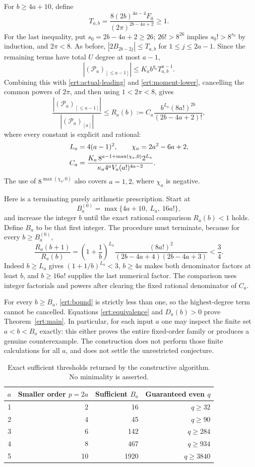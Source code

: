 For $b\ge4a+10$, define
\[
 T_{a,b}=\frac{8(2b)^{4a-4}F_0}{(2\pi)^{2b-4a+2}}\ge1.
\]
For the last inequality, put $s_0=2b-4a+2\ge26$;
$26!>8^{26}$ implies $s_0!>8^{s_0}$ by induction,
and $2\pi<8$.
As before, $|2B_{2b-2j}|\le T_{a,b}$ for $1\le j\le2a-1$.
Since the remaining terms have total $U$ degree at most $a-1$,
\[
 |(\mathscr P_a)_{[\le a-1]}|
      \le K_a b^{g_a}T_{a,b}^{a-1}.
\]
Combining this with \eqref{ert:actual-leading} and
\eqref{ert:moment-lower}, cancelling the common powers of $2\pi$,
and then using $1<2\pi<8$, gives
\begin{equation}\label{ert:bound}
 \frac{|(\mathscr P_a)_{[\le a-1]}|}{|(\mathscr P_a)_{[a]}|}
 \le R_a(b):=C_a\frac{b^{L_a}(8a!)^{2b}}{(2b-4a+2)!},
\end{equation}
where every constant is explicit and rational:
\begin{align}
 L_a&=4(a-1)^2,\qquad \chi_a=2a^2-6a+2,\notag\\
 C_a&=\frac{K_a\,8^{a-1+\max(\chi_a,0)}2^{L_a}}
 {\kappa_a4^aV_a(a!)^{4a-2}}.
 \label{ert:constant}
\end{align}
The use of $8^{\max(\chi_a,0)}$ also covers $a=1,2$, where
$\chi_a$ is negative.

Here is a terminating purely arithmetic prescription. Start at
\[
 B_a^{(0)}=\max\{4a+10,\ L_a,\ 16a!\},
\]
and increase the integer $b$ until the exact rational comparison
$R_a(b)<1$ holds. Define $B_a$ to be that first integer. The procedure
must terminate, because for every $b\ge B_a^{(0)}$,
\[
 \frac{R_a(b+1)}{R_a(b)}
 =\left(1+\frac1b\right)^{L_a}
 \frac{(8a!)^2}{(2b-4a+4)(2b-4a+3)}<\frac34.
\]
Indeed $b\ge L_a$ gives $(1+1/b)^{L_a}<3$,
$b\ge4a$ makes both denominator factors at least $b$, and
$b\ge16a!$ supplies the last numerical factor.
The comparison uses integer factorials and powers after clearing
the fixed rational denominator of $C_a$.

For every $b\ge B_a$, \eqref{ert:bound} is strictly less than one,
so the highest-degree term cannot be cancelled. Equations
\eqref{ert:equivalence} and $D_a(b)>0$ prove
Theorem~\ref{ert:main}. In particular, for each input $a$ one may
inspect the finite set $a<b<B_a$ exactly: this either proves the
entire fixed-order family or produces a genuine counterexample.
The construction does not perform those finite calculations for all
$a$, and does not settle the unrestricted conjecture.

\begin{table}[htbp]
\centering
\begin{tabular}{rrrr}
\toprule
$a$ & Smaller order $p=2a$ & Sufficient $B_a$ & Guaranteed even $q$ \\
\midrule
1 & 2  & 16   & $q\ge32$ \\
2 & 4  & 45   & $q\ge90$ \\
3 & 6  & 142  & $q\ge284$ \\
4 & 8  & 467  & $q\ge934$ \\
5 & 10 & 1920 & $q\ge3840$ \\
\bottomrule
\end{tabular}
\caption{Exact sufficient thresholds returned by the constructive
algorithm. No minimality is asserted.}
\label{ert:threshold-table}
\end{table}

